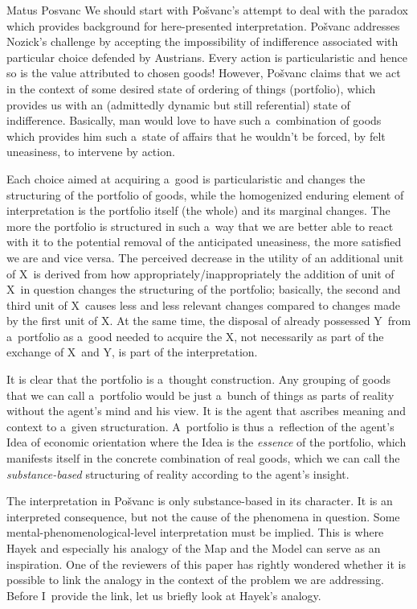 \begin{artengenv}{Matus Posvanc}
We should start with Pošvanc's 
\parencite*[][]{Posvanc2021Problem} %
 attempt to deal with the paradox which provides background for here-presented interpretation. Pošvanc addresses Nozick's challenge by accepting the impossibility of indifference associated with particular choice defended by Austrians. Every action is particularistic and hence so is the value attributed to chosen goods! However, Pošvanc claims that we act in the context of some desired state of ordering of things (portfolio), which provides us with an (admittedly dynamic but still referential) state of indifference. Basically, man would love to have such a~combination of goods which provides him such a~state of affairs that he wouldn't be forced, by felt uneasiness, to intervene by action.



Each choice aimed at acquiring a~good is particularistic and changes the structuring of the portfolio of goods, while the homogenized enduring element of interpretation is the portfolio itself (the whole) and its marginal changes. The more the portfolio is structured in such a~way that we are better able to react with it to the potential removal of the anticipated uneasiness, the more satisfied we are and vice versa. The perceived decrease in the utility of an additional unit of X~is derived from how appropriately/inappropriately the addition of unit of X~in question changes the structuring of the portfolio; basically, the second and third unit of X~causes less and less relevant changes compared to changes made by the first unit of X. At the same time, the disposal of already possessed Y~from a~portfolio as a~good needed to acquire the X, not necessarily as part of the exchange of X~and Y, is part of the interpretation.



It is clear that the portfolio is a~thought construction. Any grouping of goods that we can call a~portfolio would be just a~bunch of things as parts of reality without the agent's mind and his view. It is the agent that ascribes meaning and context to a~given structuration. A~portfolio is thus a~reflection of the agent's Idea of economic orientation where the Idea is the \textit{essence} of the portfolio, which manifests itself in the concrete combination of real goods, which we can call the \textit{substance-based} structuring of reality according to the agent's insight.



The interpretation in Pošvanc 
\parencite*[][]{Posvanc2021Problem} %
 is only substance-based in its character. It is an interpreted consequence, but not the cause of the phenomena in question. Some mental-phenomenological-level interpretation must be implied. This is where Hayek 
\parencite*[][]{Hayek1952Sensory} %
 and especially his analogy of the Map and the Model can serve as an inspiration. One of the reviewers of this paper has rightly wondered whether it is possible to link the analogy in the context of the problem we are addressing. Before I~provide the link, let us briefly look at Hayek's analogy.




\end{artengenv}
